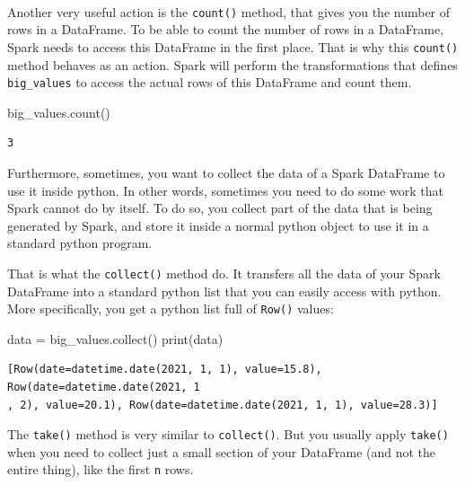 \documentclass[
  11pt,
  letterpaper,
  DIV=11,
  numbers=noendperiod]{scrreprt}
\newenvironment{Shaded}{\begin{snugshade}}{\end{snugshade}}
\newcommand{\BuiltInTok}[1]{\textcolor[rgb]{0.00,0.23,0.31}{#1}}
\newcommand{\NormalTok}[1]{\textcolor[rgb]{0.00,0.23,0.31}{#1}}
\newcommand{\OperatorTok}[1]{\textcolor[rgb]{0.37,0.37,0.37}{#1}}
\begin{document}
\begin{verbatim}
                                                                                
\end{verbatim}

Another very useful action is the \texttt{count()} method, that gives
you the number of rows in a DataFrame. To be able to count the number of
rows in a DataFrame, Spark needs to access this DataFrame in the first
place. That is why this \texttt{count()} method behaves as an action.
Spark will perform the transformations that defines \texttt{big\_values}
to access the actual rows of this DataFrame and count them.

\begin{Shaded}
\begin{Highlighting}[]
\NormalTok{big\_values.count()}
\end{Highlighting}
\end{Shaded}

\begin{verbatim}
3
\end{verbatim}

Furthermore, sometimes, you want to collect the data of a Spark
DataFrame to use it inside python. In other words, sometimes you need to
do some work that Spark cannot do by itself. To do so, you collect part
of the data that is being generated by Spark, and store it inside a
normal python object to use it in a standard python program.

That is what the \texttt{collect()} method do. It transfers all the data
of your Spark DataFrame into a standard python list that you can easily
access with python. More specifically, you get a python list full of
\texttt{Row()} values:

\begin{Shaded}
\begin{Highlighting}[]
\NormalTok{data }\OperatorTok{=}\NormalTok{ big\_values.collect()}
\BuiltInTok{print}\NormalTok{(data)}
\end{Highlighting}
\end{Shaded}

\begin{verbatim}
[Row(date=datetime.date(2021, 1, 1), value=15.8), Row(date=datetime.date(2021, 1
, 2), value=20.1), Row(date=datetime.date(2021, 1, 1), value=28.3)]
\end{verbatim}

The \texttt{take()} method is very similar to \texttt{collect()}. But
you usually apply \texttt{take()} when you need to collect just a small
section of your DataFrame (and not the entire thing), like the first
\texttt{n} rows.
\end{document}
